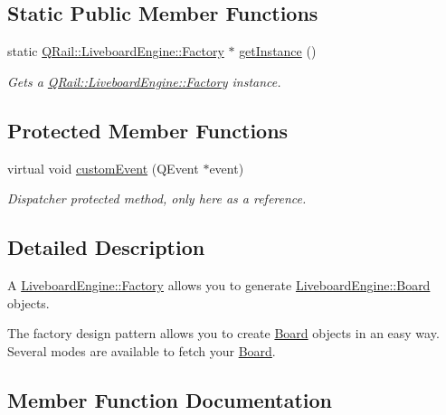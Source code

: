 \subsection*{Static Public Member Functions}
\begin{DoxyCompactItemize}
\item 
static \mbox{\hyperlink{classQRail_1_1LiveboardEngine_1_1Factory}{Q\+Rail\+::\+Liveboard\+Engine\+::\+Factory}} $\ast$ \mbox{\hyperlink{classQRail_1_1LiveboardEngine_1_1Factory_a08e37a6538aad6341edf7066f10a63c7}{get\+Instance}} ()
\begin{DoxyCompactList}\small\item\em Gets a \mbox{\hyperlink{classQRail_1_1LiveboardEngine_1_1Factory}{Q\+Rail\+::\+Liveboard\+Engine\+::\+Factory}} instance. \end{DoxyCompactList}\end{DoxyCompactItemize}
\subsection*{Protected Member Functions}
\begin{DoxyCompactItemize}
\item 
virtual void \mbox{\hyperlink{classQRail_1_1LiveboardEngine_1_1Factory_a214c37703d996797de42151ec41f55b2}{custom\+Event}} (Q\+Event $\ast$event)
\begin{DoxyCompactList}\small\item\em Dispatcher protected method, only here as a reference. \end{DoxyCompactList}\end{DoxyCompactItemize}


\subsection{Detailed Description}
A \mbox{\hyperlink{classQRail_1_1LiveboardEngine_1_1Factory}{Liveboard\+Engine\+::\+Factory}} allows you to generate \mbox{\hyperlink{classQRail_1_1LiveboardEngine_1_1Board}{Liveboard\+Engine\+::\+Board}} objects. 

The factory design pattern allows you to create \mbox{\hyperlink{classQRail_1_1LiveboardEngine_1_1Board}{Board}} objects in an easy way. Several modes are available to fetch your \mbox{\hyperlink{classQRail_1_1LiveboardEngine_1_1Board}{Board}}. 

\subsection{Member Function Documentation}
\mbox{\label{classQRail_1_1LiveboardEngine_1_1Factory_a5a581cb60c12dea0af977ea08c64e0c8}} 
